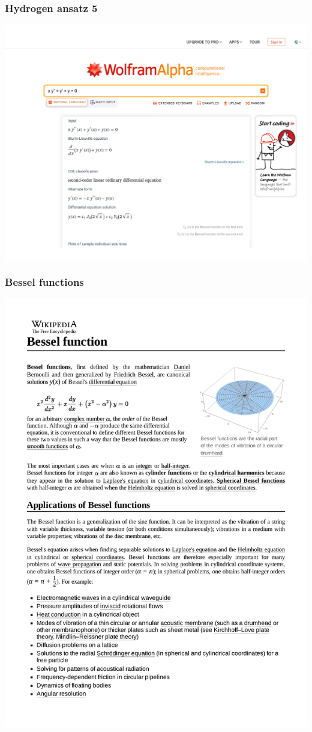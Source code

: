 \documentclass{beamer}
\begin{document}
\begin{frame}[fragile]
\frametitle{Hydrogen ansatz 5}
\includegraphics[page=1, clip, trim=0in 0in 0in 1in, width=\textwidth]{Wolfram Alpha.pdf}
\end{frame}

\begin{frame}[fragile]
\frametitle{Bessel functions}
\includegraphics[page=1, clip, trim=0in 0in 0in 0in, width=\textwidth]{Bessel function.pdf}
\end{frame}
\end{document}
